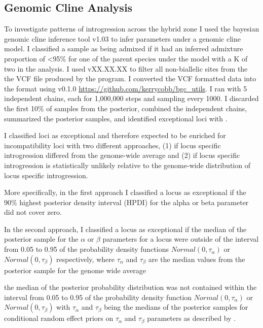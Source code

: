 \subsection{Genomic Cline Analysis}
To investigate patterns of introgression across the hybrid zone I     
used the bayesian genomic cline inference tool \bgc v1.03 \parencite{gompert2012} 
to infer parameters under a genomic cline model.
I classified a sample as being admixed if it had an inferred admixture proportion
of <95\% for one of the parent species under the model with a K of two in 
the \structure analysis.
I used \vcftools vXX.XX.XX to filter all non-biallelic sites from the the VCF file 
produced by the \populations program. 
I converted the VCF formatted data into the \bgc format using \bgcutils v0.1.0 
\url{https://github.com/kerrycobb/bgc_utils}.
I ran \bgc with 5 independent chains, each for 1,000,000 steps and sampling every 1000.
I discarded the first 10\% of samples from the posterior, combined the independent 
chains, summarized the posterior samples, and identified exceptional loci with \bgcutils. 

I classified loci as exceptional and therefore expected to be enriched for 
incompatibility loci with two different approaches, (1) if locus specific 
introgression differed from the genome-wide average and (2) if locus specific 
introgression is statistically unlikely relative to the genome-wide distribution
of locus specific introgression. 

More specifically, in the first approach I classified a locus as exceptional 
if the 90\% highest posterior density interval (HPDI) for the alpha or beta 
parameter did not cover zero.


In the second approach, I classified a locus as exceptional if the median of the  
posterior sample for the $\alpha$ or $\beta$ parameters for a locus were outside of 
the interval from 0.05 to 0.95 of the probability density functions $Normal(0, \tau_\alpha)$  
or $Normal(0, \tau_\beta)$ respectively, where $\tau_\alpha$ and $\tau_\beta$ are  
the median values from the posterior sample for the genome wide average 


the median of the posterior probability distribution was not contained within the interval from  
0.05 to 0.95 of the probability density function $Normal(0, \tau_\alpha)$ or 
$Normal(0, \tau_\beta)$ with $\tau_{\alpha}$ and $\tau_{\beta}$ being the medians of 
the posterior samples for conditional random effect priors on $\tau_\alpha$ 
and $\tau_\beta$ parameters as described by \parencite{gompert2011}.



